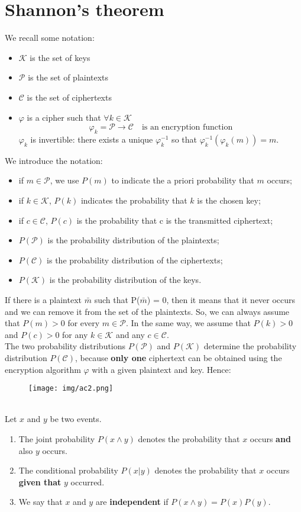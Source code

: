 \documentclass[a4paper, 10pt, titlepage]{article}
\begin{document}
\section{Shannon’s theorem}
We recall some notation:
\begin{itemize}
\item $\mathcal{K}$ is the set of keys
\item $\mathcal{P}$ is the set of plaintexts
\item $\mathcal{C}$ is the set of ciphertexts
\item $\varphi$ is a cipher such that $\forall k \in \mathcal{K}$
$$\varphi_k = \mathcal{P} \rightarrow \mathcal{C} \quad \text{is an encryption function}$$
$\varphi_k$ is invertible: there exists a unique $\varphi_k^{-1}$ so that $\varphi_k^{-1}(\varphi_k(m)) = m$.
\end{itemize}
We introduce the notation:
\begin{itemize}
\item if $m \in \mathcal{P}$, we use $P(m)$ to indicate the a priori probability that $m$ occurs;
\item if $k \in \mathcal{K}$, $P(k)$ indicates the probability that $k$ is the chosen key;
\item if $c \in \mathcal{C}$, $P(c)$ is the probability that c is the transmitted ciphertext;
\item $P(\mathcal{P})$ is the probability distribution of the plaintexts;
\item $P(\mathcal{C})$ is the probability distribution of the ciphertexts;
\item $P(\mathcal{K})$ is the probability distribution of the keys.
\end{itemize}
If there is a plaintext $\bar{m}$ such that P($\bar{m}$) = 0, then it means that it never occurs and we can remove it from the set of the plaintexts. So, we can always assume that $P(m) > 0$ for every $m \in \mathcal{P}$.
In the same way, we assume that $P(k) > 0$ and $P(c) > 0$ for any $k \in \mathcal{K}$ and any $c \in \mathcal{C}$.\\
The two probability distributions $P(\mathcal{P})$ and $P(\mathcal{K})$ determine the probability distribution $P(\mathcal{C})$, because \textbf{only one} ciphertext can be obtained using the encryption algorithm $\varphi$ with a given plaintext and key. Hence:
\begin{figure}[h]
\centering
\texttt{[image: img/ac2.png]}
\end{figure}\\
Let $x$ and $y$ be two events.
\begin{enumerate}
\item The joint probability $P(x \wedge y )$ denotes the probability that $x$ occurs \textbf{and} also $y$ occurs.
\item The conditional probability $P(x | y )$ denotes the probability that $x$ occurs \textbf{given that} $y$ occurred.
\item We say that $x$ and $y$ are \textbf{independent} if $P(x \wedge y ) = P(x)P(y )$.
\end{enumerate}
\end{document}
